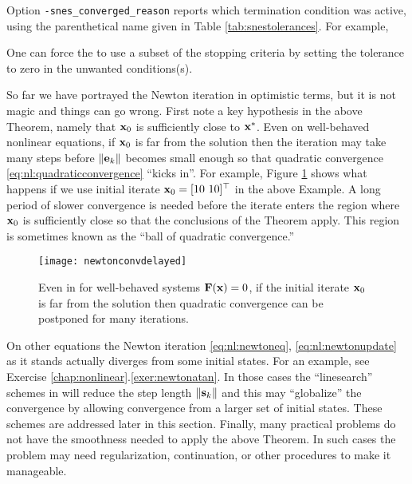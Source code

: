\medskip
Option \texttt{-snes\_converged\_reason} reports which termination condition was active, using the parenthetical name given in Table \ref{tab:snestolerances}.  For example,
\vspace{-4mm}
One can force the \pSNES to use a subset of the stopping criteria by setting the tolerance to zero in the unwanted conditions(s).

So far we have portrayed the Newton iteration in optimistic terms, but it is not magic and things can go wrong.  First note a key hypothesis in the above Theorem, namely that $\mathbf{x}_0$ is sufficiently close to $\mathbf{x}^*$.  Even on well-behaved nonlinear equations, if $\mathbf{x}_0$ is far from the solution then the iteration may take many steps before $\|\mathbf{e}_k\|$ becomes small enough so that quadratic convergence \eqref{eq:nl:quadraticconvergence} ``kicks in''.  For example, Figure \ref{fig:newtonconvdelayed} shows what happens if we use initial iterate $\mathbf{x}_0=[10\,\, 10]^\top$ in the above Example.  A long period of slower convergence is needed before the iterate enters the region where $\mathbf{x}_0$ is sufficiently close so that the conclusions of the Theorem apply.  This region is sometimes known as the ``ball of quadratic convergence.''

\begin{figure}
\texttt{[image: newtonconvdelayed]}
\caption{Even in for well-behaved systems $\mathbf{F}(\mathbf{x})=0$, if the initial iterate $\mathbf{x}_0$ is far from the solution then quadratic convergence can be postponed for many iterations.}
\label{fig:newtonconvdelayed}
\end{figure}

On other equations the Newton iteration \eqref{eq:nl:newtoneq}, \eqref{eq:nl:newtonupdate} as it stands actually diverges from some initial states.  For an example, see Exercise \ref{chap:nonlinear}.\ref{exer:newtonatan}.  In those cases the ``linesearch'' schemes in \PETSc will reduce the step length $\|\mathbf{s}_k\|$ and this may ``globalize'' the convergence \citep{Kelley2003} by allowing convergence from a larger set of initial states.  These schemes are addressed later in this section.  Finally, many practical problems do not have the smoothness needed to apply the above Theorem.  In such cases the problem may need regularization, continuation, or other procedures to make it manageable.



